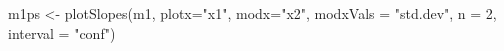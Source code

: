 \begin{Schunk}
\begin{Sinput}
 m1ps <- plotSlopes(m1, plotx="x1", modx="x2", modxVals = "std.dev", n = 2, interval = "conf")
\end{Sinput}
\end{Schunk}

